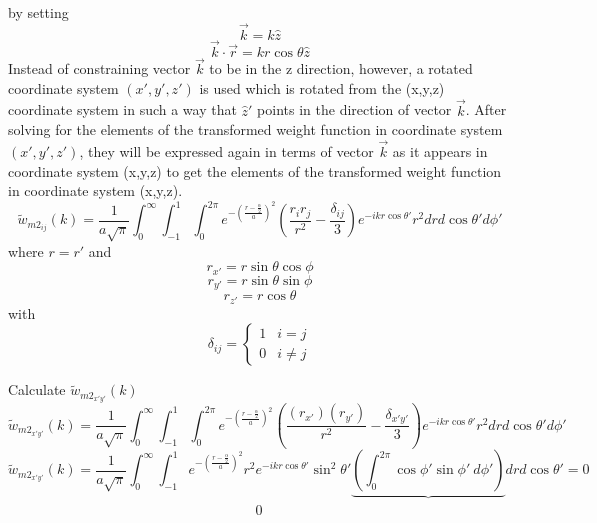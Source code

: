 \documentclass[double,12pt]{beavtex}
\begin{document}
by setting 
\begin{equation}{\vec{k}=k\hat{z}}\end{equation}
\begin{equation}{\vec{k}\cdot\vec{r}=kr\cos\theta\hat{z}}\end{equation}
Instead of constraining vector $\vec{k}$ to be in the z direction, 
however, a rotated coordinate system $(x',y',z')$ is used which is 
rotated from the (x,y,z) coordinate system in such a way that $\hat{z}'$ 
points in the direction of vector $\vec{k}$. After solving for the 
elements of the transformed weight function in coordinate system 
$(x',y',z')$, they will be expressed again in terms of vector $\vec{k}$ 
as it appears in coordinate system (x,y,z) to get the elements of the 
transformed weight function in coordinate system (x,y,z). 
\begin{equation}{\widetilde{w}_{m2_{ij}}(k)=\frac{1}{a\sqrt{\pi}}\int_{0}^{\infty}\int_{-1}^{1}\int_{0}^{2\pi}e^{-\left(\frac{r-\frac{\alpha}{2}}{a}\right)^2}\left(\frac{r_ir_j}{r^2}-\frac{\delta_{ij}}{3}\right)e^{-ikr\cos\theta'}r^2d{r}d{\cos\theta'}d{\phi'}}\end{equation}
where $r=r'$ and
\begin{displaymath}{r_{x'}=r\sin\theta\cos\phi}\end{displaymath}
\begin{displaymath}{r_{y'}=r\sin\theta\sin\phi}\end{displaymath}
\begin{displaymath}{r_{z'}=r\cos\theta}\end{displaymath} 
with
\begin{displaymath}{\delta_{ij}=\left\{ \begin{array}{rc} 1 & i = j \\ 0  & i\neq j \end{array}\right.}\end{displaymath}

Calculate $\widetilde{w}_{{m2}_{x'y'}}(k)$ 
\begin{equation}{\widetilde{w}_{{m2}_{x'y'}}(k)=\frac{1}{a\sqrt{\pi}}\int_{0}^{\infty}\int_{-1}^{1}\int_{0}^{2\pi}e^{-\left(\frac{r-\frac{\alpha}{2}}{a}\right)^2}\left(\frac{(r_{x'})(r_{y'})}{r^2}-\frac{\delta_{x'y'}}{3}\right)e^{-ikr\cos\theta'}r^2d{r}d{\cos\theta'}d{\phi'}}\end{equation}
\begin{equation}{\widetilde{w}_{{m2}_{x'y'}}(k)=\frac{1}{a\sqrt{\pi}}\int_{0}^{\infty}\int_{-1}^{1}e^{-\left(\frac{r-\frac{\alpha}{2}}{a}\right)^2}r^2e^{-ikr\cos\theta'}\sin^2\theta'\underbrace{\left(\int_{0}^{2\pi}\cos\phi'\sin{\phi'}~d{\phi'}\right)}d{r}d{\cos\theta'}=0}\end{equation}
$~~~~~~~~~~~~~~~~~~~~~~~~~~~~~~~~~~~~~~~~~~~~~~~~~~~~~~~~~~~~~~~~~~~~~~~~~~~~~~~~0$
\end{document}
